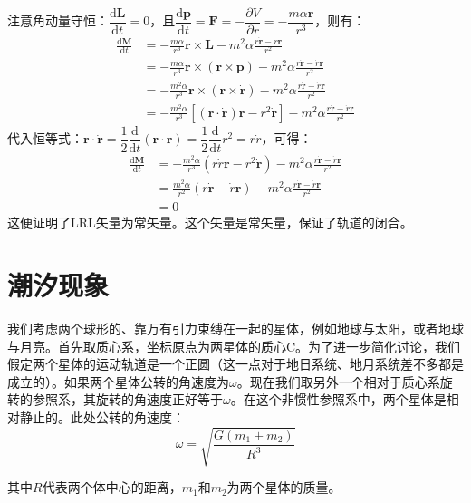 \documentclass[a4paper,openany]{book}
\begin{document}
注意角动量守恒：$\dfrac{\mathrm{d}\bm{L}}{\mathrm{d}t}=0$，且$\dfrac{\mathrm{d}\bm{p}}{\mathrm{d}t}=\bm{F}=-\dfrac{\partial V}{\partial r}=-\dfrac{m\alpha\bm{r}}{r^3}$，则有：
\begin{align*}
    \frac{\mathrm{d}\bm{M}}{\mathrm{d}t}
    &= -\frac{m\alpha}{r^3}\bm{r}\times\bm{L} - m^2\alpha\frac{r\dot{\bm{r}} - \dot{r}\bm{r}}{r^2} \\
    &= -\frac{m\alpha}{r^3}\bm{r}\times(\bm{r}\times\bm{p}) - m^2\alpha\frac{r\dot{\bm{r}} - \dot{r}\bm{r}}{r^2} \\
    &= -\frac{m^2\alpha}{r^3}\bm{r}\times(\bm{r}\times\dot{\bm{r}}) - m^2\alpha\frac{r\dot{\bm{r}} - \dot{r}\bm{r}}{r^2} \\
    &= -\frac{m^2\alpha}{r^3}[(\bm{r}\cdot\dot{\bm{r}})\bm{r}-r^2\dot{\bm{r}}] - m^2\alpha\frac{r\dot{\bm{r}} - \dot{r}\bm{r}}{r^2}
\end{align*}
代入恒等式：$\bm{r}\cdot\dot{\bm{r}} = \dfrac{1}{2}\dfrac{\mathrm{d}}{\mathrm{d}t}(\bm{r}\cdot\bm{r}) = \dfrac{1}{2}\dfrac{\mathrm{d}}{\mathrm{d}t}r^2 = r\dot{r}$，可得：
\begin{align*}
    \frac{\mathrm{d}\bm{M}}{\mathrm{d}t}
    &= -\frac{m^2\alpha}{r^3}(r\dot{r}\bm{r}-r^2\dot{\bm{r}}) - m^2\alpha\frac{r\dot{\bm{r}} - \dot{r}\bm{r}}{r^2} \\
    &= \frac{m^2\alpha}{r^2}(r\dot{\bm{r}}-\dot{r}\bm{r}) - m^2\alpha\frac{r\dot{\bm{r}} - \dot{r}\bm{r}}{r^2} \\
    &= 0
\end{align*}
这便证明了LRL矢量为常矢量。这个矢量是常矢量，保证了轨道的闭合。

\chapter*{潮汐现象}

我们考虑两个球形的、靠万有引力束缚在一起的星体，例如地球与太阳，或者地球与月亮。首先取质心系，坐标原点为两星体的质心C。为了进一步简化讨论，我们假定两个星体的运动轨道是一个正圆（这一点对于地日系统、地月系统差不多都是成立的）。如果两个星体公转的角速度为$\omega$。现在我们取另外一个相对于质心系旋转的参照系，其旋转的角速度正好等于$\omega$。在这个非惯性参照系中，两个星体是相对静止的。此处公转的角速度：
\begin{equation}
\omega = \sqrt{\frac{G(m_1 + m_2)}{R^3}}
\end{equation}

其中$R$代表两个体中心的距离，$m_1$和$m_2$为两个星体的质量。
\end{document}
